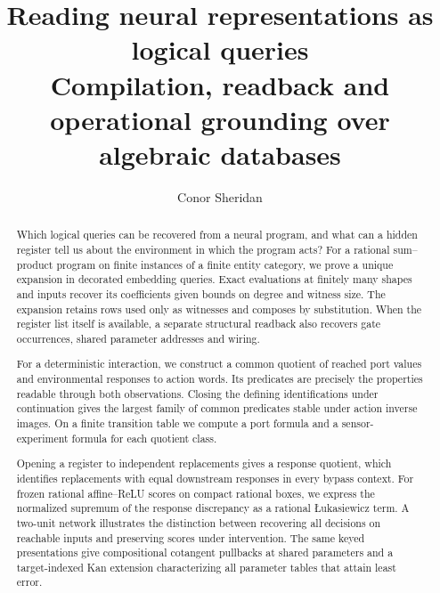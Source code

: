 \documentclass[11pt,a4paper]{article}
\title{Reading neural representations as logical queries\\\large Compilation, readback and operational grounding over algebraic databases}
\author{Conor Sheridan}
\date{}
\theoremstyle{definition}
\theoremstyle{remark}\newaliascnt{remark}{theorem}
\numberwithin{equation}{section}
\begin{document}
\maketitle
\begin{abstract}
Which logical queries can be recovered from a neural program, and what can a hidden register tell us about the environment in which the program acts? For a rational sum--product program on finite instances of a finite entity category, we prove a unique expansion in decorated embedding queries. Exact evaluations at finitely many shapes and inputs recover its coefficients given bounds on degree and witness size. The expansion retains rows used only as witnesses and composes by substitution. When the register list itself is available, a separate structural readback also recovers gate occurrences, shared parameter addresses and wiring.

For a deterministic interaction, we construct a common quotient of reached port values and environmental responses to action words. Its predicates are precisely the properties readable through both observations. Closing the defining identifications under continuation gives the largest family of common predicates stable under action inverse images. On a finite transition table we compute a port formula and a sensor-experiment formula for each quotient class.

Opening a register to independent replacements gives a response quotient, which identifies replacements with equal downstream responses in every bypass context. For frozen rational affine--ReLU scores on compact rational boxes, we express the normalized supremum of the response discrepancy as a rational \L{}ukasiewicz term. A two-unit network illustrates the distinction between recovering all decisions on reachable inputs and preserving scores under intervention. The same keyed presentations give compositional cotangent pullbacks at shared parameters and a target-indexed Kan extension characterizing all parameter tables that attain least error.
\end{abstract}
\clearpage
\begingroup
\makeatletter
\small
\setlength{\parskip}{0pt}
\renewcommand*{\l@section}{\@dottedtocline{1}{0em}{2.4em}}
\renewcommand*{\l@part}[2]{\addpenalty{-200}\addvspace{.65\baselineskip}%
  {\bfseries\noindent #1\hfill #2\par}\nobreak}
\tableofcontents
\makeatother
\endgroup
\clearpage
\end{document}
